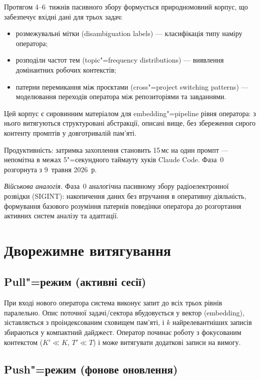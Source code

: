 \documentclass[11pt]{article}
\begin{document}
Протягом 4--6~тижнів пасивного збору формується природномовний корпус, що забезпечує вхідні дані для трьох задач:
\begin{itemize}[nosep]
  \item розмежувальні мітки (disambiguation labels) --- класифікація типу наміру оператора;
  \item розподіли частот тем (topic"=frequency distributions) --- виявлення домінантних робочих контекстів;
  \item патерни перемикання між проєктами (cross"=project switching patterns) --- моделювання переходів оператора між репозиторіями та завданнями.
\end{itemize}

\noindent
Цей корпус є сировинним матеріалом для embedding"=pipeline рівня оператора: з нього витягуються структуровані абстракції, описані вище, без збереження сирого контенту промптів у довготривалій пам'яті.

Продуктивність: затримка захоплення становить 15\,мс на один промпт --- непомітна в межах 5"=секундного таймауту хуків Claude Code.
Фаза~0 розгорнута з 9~травня 2026~р.

\medskip
\noindent\textit{Військова аналогія.}
Фаза~0 аналогічна пасивному збору радіоелектронної розвідки (SIGINT): накопичення даних без втручання в оперативну діяльність, формування базового розуміння патернів поведінки оператора до розгортання активних систем аналізу та адаптації.


\section{Дворежимне витягування}
\label{sec:dual-mode}

\subsection{Pull"=режим (активні сесії)}

При вході нового оператора система виконує запит до всіх трьох рівнів паралельно.
Опис поточної задачі/сектора вбудовується у вектор (embedding), зіставляється з проіндексованим сховищем пам'яті, і $k$ найрелевантніших записів збираються у компактний дайджест.
Оператор починає роботу з фокусованим контекстом ($K' \ll K$, $T' \ll T$) і може витягувати додаткові записи на вимогу.

\subsection{Push"=режим (фонове оновлення)}
\end{document}
